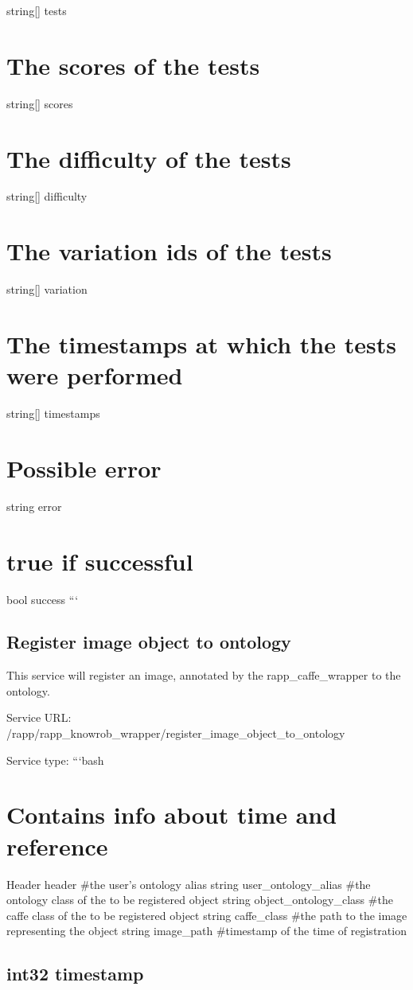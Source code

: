 string\mbox{[}\mbox{]} tests \section*{The scores of the tests}

string\mbox{[}\mbox{]} scores \section*{The difficulty of the tests}

string\mbox{[}\mbox{]} difficulty \section*{The variation ids of the tests}

string\mbox{[}\mbox{]} variation \section*{The timestamps at which the tests were performed}

string\mbox{[}\mbox{]} timestamps \section*{Possible error}

string error \section*{true if successful}

bool success ```

\subsection*{Register image object to ontology}

This service will register an image, annotated by the rapp\-\_\-caffe\-\_\-wrapper to the ontology.

Service U\-R\-L\-: {\ttfamily /rapp/rapp\-\_\-knowrob\-\_\-wrapper/register\-\_\-image\-\_\-object\-\_\-to\-\_\-ontology}

Service type\-: ```bash \section*{Contains info about time and reference}

Header header \#the user's ontology alias string user\-\_\-ontology\-\_\-alias \#the ontology class of the to be registered object string object\-\_\-ontology\-\_\-class \#the caffe class of the to be registered object string caffe\-\_\-class \#the path to the image representing the object string image\-\_\-path \#timestamp of the time of registration \subsection*{int32 timestamp }

